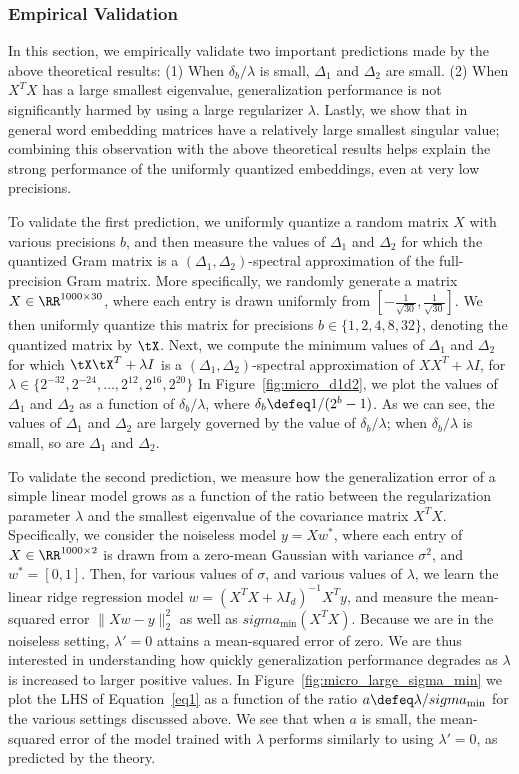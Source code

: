 \subsubsection{Empirical Validation}
\label{sec:theory_validation}
In this section, we empirically validate two important predictions made by the above theoretical results: (1) When $\delta_b/\lambda$ is small, $\Delta_1$ and $\Delta_2$ are small. (2) When $X^T X$ has a large smallest eigenvalue, generalization performance is not significantly harmed by using a large regularizer $\lambda$.
Lastly, we show that in general word embedding matrices have a relatively large smallest singular value;
combining this observation with the above theoretical results helps explain the strong performance of the uniformly quantized embeddings, even at very low precisions.

To validate the first prediction, we uniformly quantize a random matrix $X$ with various precisions $b$, and then measure the values of $\Delta_1$ and $\Delta_2$ for which the quantized Gram matrix is a $(\Delta_1,\Delta_2)$-spectral approximation of the full-precision Gram matrix.
More specifically, we randomly generate a matrix $X \in \RR^{1000 \times 30}$, where each entry is drawn uniformly from $[-\frac{1}{\sqrt{30}},\frac{1}{\sqrt{30}}]$.
We then uniformly quantize this matrix for precisions $b \in \{1,2,4,8,32\}$, denoting the quantized matrix by $\tX$.
Next, we compute the minimum values of $\Delta_1$ and $\Delta_2$ for which $\tX\tX^T + \lambda I$ is a $(\Delta_1,\Delta_2)$-spectral approximation of $XX^T + \lambda I$, for $\lambda \in \{2^{-32}, 2^{-24}, \ldots, 2^{12}, 2^{16}, 2^{20}\}$ 
In Figure~\ref{fig:micro_d1d2}, we plot the values of $\Delta_1$ and $\Delta_2$ as a function of $\delta_b/\lambda$, where $\delta_b \defeq 1/(2^b-1)$.
As we can see, the values of $\Delta_1$ and $\Delta_2$ are largely governed by the value of $\delta_b/\lambda$; when $\delta_b/\lambda$ is small, so are $\Delta_1$ and $\Delta_2$.

To validate the second prediction, we measure how the generalization error of a simple linear model grows as a function of the ratio between the regularization parameter $\lambda$ and the smallest eigenvalue of the covariance matrix $X^T X$.
Specifically, we consider the noiseless model $y = Xw^*$, where each entry of $X \in \RR^{1000 \times 2}$ is drawn from a zero-mean Gaussian with variance $\sigma^2$, and $w^*=[0,1]$.
Then, for various values of $\sigma$, and various values of $\lambda$, we learn the linear ridge regression model $w = (X^T X + \lambda I_d)^{-1}X^Ty$, and measure the mean-squared error $\|Xw-y\|_2^2$ as well as $sigma_{\min}(X^T X)$.
Because we are in the noiseless setting, $\lambda'=0$ attains a mean-squared error of zero.
We are thus interested in understanding how quickly generalization performance degrades as $\lambda$ is increased to larger positive values.
In Figure~\ref{fig:micro_large_sigma_min} we plot the LHS of Equation~\eqref{eq1} as a function of the ratio $a \defeq \lambda/sigma_{\min}$ for the various settings discussed above.
We see that when $a$ is small, the mean-squared error of the model trained with $\lambda$ performs similarly to using $\lambda'=0$, as predicted by the theory.

